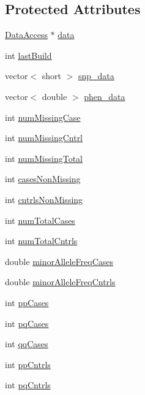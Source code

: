 \subsection*{Protected Attributes}
\begin{DoxyCompactItemize}
\item 
\hyperlink{classDataAccess}{DataAccess} $\ast$ \hyperlink{classPopStats_ab8e2c80b263739bdf74f96cda7748641}{data}
\item 
int \hyperlink{classPopStats_ad2f6320ab9374d3a41db9442d5aa09e5}{lastBuild}
\item 
vector$<$ short $>$ \hyperlink{classPopStats_aa9ae8c1f4f068085d3865bc95f3ad378}{snp\_\-data}
\item 
vector$<$ double $>$ \hyperlink{classPopStats_a10660ebe8a9e2e2e764323ca4b0450c6}{phen\_\-data}
\item 
int \hyperlink{classPopStats_aa30d8fe670d6df9b809850c9f87552e4}{numMissingCase}
\item 
int \hyperlink{classPopStats_af2e6df2b17b5c5cfff07d741bf5c4ded}{numMissingCntrl}
\item 
int \hyperlink{classPopStats_a12affeff0b6a75ab261a03b97c4012cd}{numMissingTotal}
\item 
int \hyperlink{classPopStats_a666ffd1a39165fd8eabba4392fdc11ec}{casesNonMissing}
\item 
int \hyperlink{classPopStats_a5c9ad628d03a382c17984ff173d715ad}{cntrlsNonMissing}
\item 
int \hyperlink{classPopStats_a6d6250c75148627d06f610cdf3e12a6e}{numTotalCases}
\item 
int \hyperlink{classPopStats_ac49a970c1ad1867f7a829e64ac71b949}{numTotalCntrls}
\item 
double \hyperlink{classPopStats_a91e20648d527864a50ccc91d376467fd}{minorAlleleFreqCases}
\item 
double \hyperlink{classPopStats_acaeb5d354c694c7ede568b63afe0a56d}{minorAlleleFreqCntrls}
\item 
int \hyperlink{classPopStats_ad054f051a5d1f63e6f4e56e0a415020c}{ppCases}
\item 
int \hyperlink{classPopStats_a3924fd6d691da0ec9588cdc82f576b60}{pqCases}
\item 
int \hyperlink{classPopStats_a5853b66b49a213cc8dda8438c2283691}{qqCases}
\item 
int \hyperlink{classPopStats_ac3a9fad2b63da4e68b9c5b407485e58e}{ppCntrls}
\item 
int \hyperlink{classPopStats_ad5b2ca615dc22f4b99f9ec771432fae7}{pqCntrls}
\item 

\end{DoxyCompactItemize}
